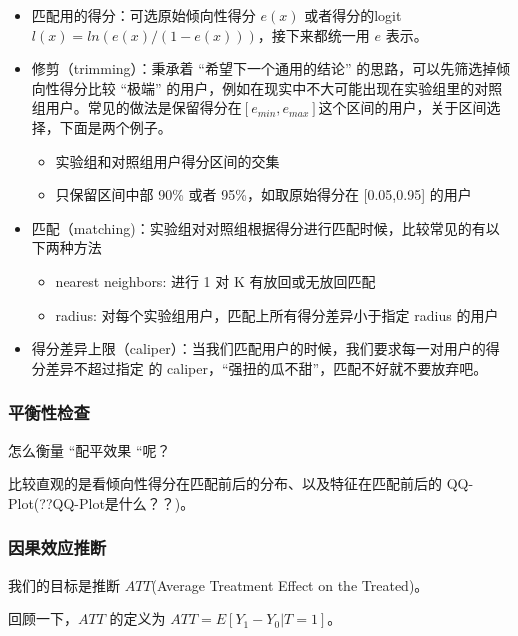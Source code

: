 \documentclass[12pt]{article}
\begin{document}
\begin{itemize}
\setlength{\itemsep}{0pt}
\setlength{\parsep}{0pt}
\setlength{\parskip}{0pt}
    \item 匹配用的得分：可选原始倾向性得分 $e(x)$ 或者得分的logit
$l(x)=ln(e(x)/(1−e(x)))$，接下来都统一用 $e$ 表示。
        
    \item 修剪（trimming）：秉承着 “希望下一个通用的结论” 的思路，可以先筛选掉倾向性得分比较 “极端” 的用户，例如在现实中不大可能出现在实验组里的对照组用户。常见的做法是保留得分在$[e_{min}, e_{max}] $这个区间的用户，关于区间选择，下面是两个例子。
    \begin{itemize}
\setlength{\itemsep}{0pt}
\setlength{\parsep}{0pt}
\setlength{\parskip}{0pt}
	\item 实验组和对照组用户得分区间的交集
	\item 只保留区间中部 90\% 或者 95\%，如取原始得分在 [0.05,0.95] 的用户
\end{itemize}

    \item 匹配（matching)：实验组对对照组根据得分进行匹配时候，比较常见的有以下两种方法
        \begin{itemize}
\setlength{\itemsep}{0pt}
\setlength{\parsep}{0pt}
\setlength{\parskip}{0pt}
	\item nearest neighbors: 进行 1 对 K 有放回或无放回匹配
	\item radius: 对每个实验组用户，匹配上所有得分差异小于指定 radius 的用户
\end{itemize}

    \item 得分差异上限（caliper）：当我们匹配用户的时候，我们要求每一对用户的得分差异不超过指定
的 caliper，“强扭的瓜不甜”，匹配不好就不要放弃吧。
\end{itemize}


\subsubsection{平衡性检查}
怎么衡量 “配平效果 “呢？

比较直观的是看倾向性得分在匹配前后的分布、以及特征在匹配前后的 QQ-Plot(??QQ-Plot是什么？？)。

\subsubsection{因果效应推断}
我们的目标是推断 $ATT$(Average Treatment Effect on the Treated)。

回顾一下，$ATT$ 的定义为 $ATT=E[Y_1−Y_0|T=1]$。
\end{document}

